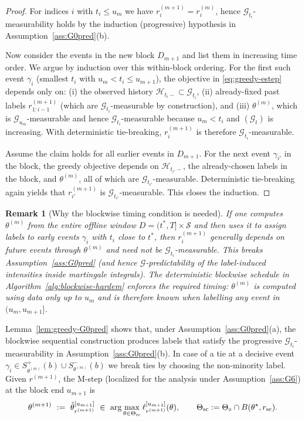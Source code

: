\documentclass{statsoc}
\newtheorem{remark}[remark]{Remark}
\newcommand{\1}{\mathbbm{1}}
\begin{document}
\begin{proof}
For indices $i$ with $t_i\le u_m$ we have $r_i^{(m+1)}=r_i^{(m)}$, hence $\mathcal G_{t_i}$-measurability holds by the
induction (progressive) hypothesis in Assumption~\ref{ass:G0pred}(b).

Now consider the events in the new block $D_{m+1}$ and list them in increasing time order.
We argue by induction over this within-block ordering.
For the first such event $\gamma_i$ (smallest $t_i$ with $u_m<t_i\le u_{m+1}$), the objective in \eqref{eq:greedy-estep}
depends only on:
(i) the observed history $\mathcal H_{t_i-}\subset \mathcal G_{t_i}$,
(ii) already-fixed past labels $r^{(m+1)}_{1:i-1}$ (which are $\mathcal G_{t_i}$-measurable by construction),
and (iii) $\theta^{(m)}$, which is $\mathcal G_{u_m}$-measurable and hence $\mathcal G_{t_i}$-measurable because $u_m<t_i$
and $(\mathcal G_t)$ is increasing.
With deterministic tie-breaking, $r_i^{(m+1)}$ is therefore $\mathcal G_{t_i}$-measurable.

Assume the claim holds for all earlier events in $D_{m+1}$. For the next event $\gamma_{i'}$ in the block,
the greedy objective depends on $\mathcal H_{t_{i'}-}$, the already-chosen labels in the block,
and $\theta^{(m)}$, all of which are $\mathcal G_{t_{i'}}$-measurable. Deterministic tie-breaking again yields that
$r_{i'}^{(m+1)}$ is $\mathcal G_{t_{i'}}$-measurable. This closes the induction.
\end{proof}

\begin{remark}[Why the blockwise timing condition is needed]\label{rem:theta-conditioning}
If one computes $\theta^{(m)}$ from the entire offline window $D=(t^\ast,T]\times\mathcal S$ and then uses it to
assign labels to early events $\gamma_i$ with $t_i$ close to $t^\ast$, then $r_i^{(m+1)}$ generally depends on future events
through $\theta^{(m)}$ and need not be $\mathcal G_{t_i}$-measurable. This breaks Assumption~\ref{ass:G0pred}
(and hence $\mathcal G$-predictability of the label-induced intensities inside martingale integrals).
The deterministic blockwise schedule in Algorithm~\ref{alg:blockwise-hardem} enforces the required timing:
$\theta^{(m)}$ is computed using data only up to $u_m$ and is therefore known when labelling any event in $(u_m,u_{m+1}]$.
\end{remark}


Lemma~\ref{lem:greedy-G0pred} shows that, under Assumption~\ref{ass:G0pred}(a), the blockwise sequential construction produces labels that satisfy the progressive $\mathcal G_{t_i}$-measurability in Assumption~\ref{ass:G0pred}(b). In case of a tie at a decisive event $\gamma_i\in S^+_{\theta^{(m)}}(b)\cup S^-_{\theta^{(m)}}(b)$ we break ties by choosing the non-minority label. Given $r^{(m+1)}$, the M-step (localized for the analysis under Assumption~\ref{ass:G6}) at the block end $u_{m+1}$ is
\[
\theta^{(m+1)}\ :=\ \hat\theta_{r^{(m+1)}}^{[u_{m+1}]}\ \in\ \arg\max_{\theta\in\Theta_{\rm sc}}\ell_{r^{(m+1)}}^{[u_{m+1}]}(\theta),
\qquad
\Theta_{\rm sc}:=\Theta_\circ\cap B(\theta^\star,r_{\rm sc}).
\]
\end{document}
